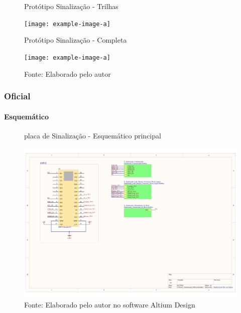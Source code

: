 \documentclass[../delivery_hospital_report.tex]{subfiles}
\begin{document}
\begin{figure}[!ht]
    \centering
    \begin{minipage}{0.5\textwidth}
        \centering
        \caption{Protótipo Sinalização - Trilhas}
        \texttt{[image: example-image-a]} 
        \label{fig:figura1minipg}
    \end{minipage}\hfill
    \begin{minipage}{0.5\textwidth}
        \centering
        \caption{Protótipo Sinalização - Completa }
        \texttt{[image: example-image-a]} 
        \label{fig:figura1minipg}
    \end{minipage}\hfill
    
    \caption*{Fonte: Elaborado pelo autor }
    \label{fig:figurasminipg}
\end{figure}

\subsubsection{Oficial}

\paragraph{Esquemático}

\begin{figure}[h]
\centering
    \caption{placa de Sinalização - Esquemático principal }
    \centering %
    \includegraphics[width=17cm]{modulos/Sinalização_Official-1.png}
    \caption*{Fonte: Elaborado pelo autor no software Altium Design\cite{altium21} }
    \label{Protótipo placa de ## - Esquemático principal}
\end{figure}
\end{document}
